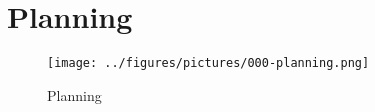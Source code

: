 \chapter{Planning}
\begin{figure}[htp]
	\begin{center}
		\texttt{[image: ../figures/pictures/000-planning.png]}
		\caption[Planning]{Planning}
		\label{fig:planning} %
	\end{center}
\end{figure}


